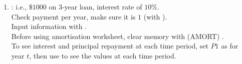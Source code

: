 \begin{method}
\begin{enumerate}[label=\roman*.]
Enter interest rate with  [VALUE]  \fbox{\strut $\downarrow$}, then  to get present value, PV.
\item {}: i.e., $\$1000$ on $3$-year loan, interest rate of $10\%$.\\
Check payment per year, make sure it is $1$ (with  ).\\
Input information with        .\\
Before using amortisation worksheet, clear memory with   (AMORT)  .\\
To see interest and principal repayment at each time period, set $P1$ as  for year $t$, then use  \fbox{\strut $\downarrow$} to see the values at each time period.
\end{enumerate}
\end{method}
